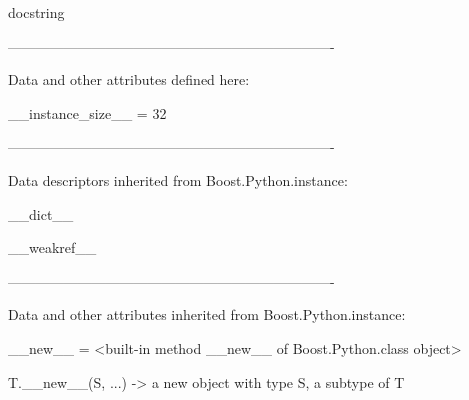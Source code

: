 \documentclass[letterpaper,10pt,english]{sphinxmanual}
\begin{document}
\begin{description}
\begin{description}
\begin{DUlineblock}{0em}
\begin{DUlineblock}{\DUlineblockindent}
\begin{DUlineblock}{\DUlineblockindent}
\item[] docstring
\item[] 
\end{DUlineblock}
\end{DUlineblock}
\item[] ----------------------------------------------------------------------
\item[] Data and other attributes defined here:
\item[] 
\item[] \_\_instance\_size\_\_ = 32
\item[] 
\item[] ----------------------------------------------------------------------
\item[] Data descriptors inherited from Boost.Python.instance:
\item[] 
\item[] \_\_dict\_\_
\item[] 
\item[] \_\_weakref\_\_
\item[] 
\item[] ----------------------------------------------------------------------
\item[] Data and other attributes inherited from Boost.Python.instance:
\item[] 
\item[] \_\_new\_\_ = \textless{}built-in method \_\_new\_\_ of Boost.Python.class object\textgreater{}
\item[]
\begin{DUlineblock}{\DUlineblockindent}
\item[] T.\_\_new\_\_(S, ...) -\textgreater{} a new object with type S, a subtype of T
\end{DUlineblock}
\end{DUlineblock}


\end{description}
\end{description}
\end{document}
